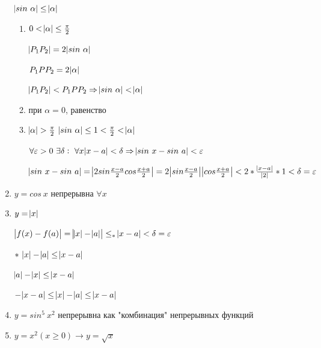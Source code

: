 \documentclass{article}
\begin{document}
\begin{enumerate}
        \( \abs{sin\ \alpha} \leq \abs{\alpha} \)

        \begin{enumerate}
            \item \(0 < \abs{\alpha} \leq \frac{\pi}{2}\)

            \(\abs{P_1P_2}=2\abs{sin\ \alpha}\)

            \( P_1PP_2 = 2\abs{\alpha}\)
            
            \(\abs{P_1P_2}<P_1PP_2 \Rightarrow \abs{sin\ \alpha} < \abs{\alpha}\)

            \item при \( \alpha = 0 \), равенство
            \item \( \abs{\alpha} > \frac{\pi}{2}\ \abs{sin\ \alpha} \leq 1 < \frac{\pi}{2} < \abs{\alpha} \)
            
            \( \forall \varepsilon > 0\ \exists \delta:\ \forall x \abs{x - a} < \delta \Rightarrow \abs{sin\ x - sin\ a} < \varepsilon \)
            
            \(\abs{sin\ x - sin\ a} = \abs{2sin\frac{x-a}{2}cos\frac{x+a}{2}} = 2\abs{sin\frac{x - a}{2}}\abs{cos\frac{x + a}{2}} < 2 * \frac{\abs{x - a}}{\abs{2}} * 1 < \delta = \varepsilon\)
        \end{enumerate}

        \item \(y = cos\ x\) непрерывна \(\forall x\)        
        \item \(y = \abs{x}\)

        \(\abs{f(x)-f(a)} = \abs{\abs{x}-\abs{a}} \leq_* \abs{x-a} < \delta = \varepsilon\)

        \(*\ \abs{x}-\abs{a} \leq \abs{x-a}\)
        
        \(\abs{a}-\abs{x} \leq \abs{x-a}\)

        \(-\abs{x-a} \leq \abs{x} - \abs{a} \leq \abs{x-a}\)

        \item \( y = sin^5\ x^2 \) непрерывна как "комбинация" непрерывных функций
        \item \( y = x^2 (x \geq 0) \rightarrow y = \sqrt{x} \) 
    \end{enumerate}
\end{document}
